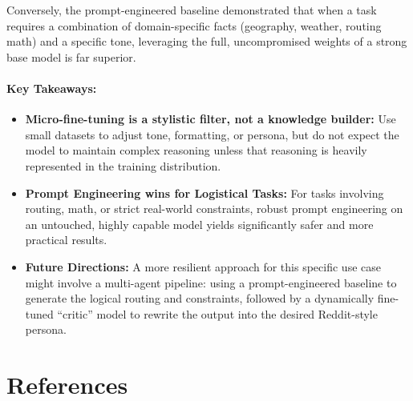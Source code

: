 \documentclass[12pt]{article}
\begin{document}
Conversely, the prompt-engineered baseline demonstrated that when a task requires a combination of domain-specific facts (geography, weather, routing math) and a specific tone, leveraging the full, uncompromised weights of a strong base model is far superior.

\paragraph{Key Takeaways:}
\begin{itemize}
    \item \textbf{Micro-fine-tuning is a stylistic filter, not a knowledge builder:} Use small datasets to adjust tone, formatting, or persona, but do not expect the model to maintain complex reasoning unless that reasoning is heavily represented in the training distribution.
    \item \textbf{Prompt Engineering wins for Logistical Tasks:} For tasks involving routing, math, or strict real-world constraints, robust prompt engineering on an untouched, highly capable model yields significantly safer and more practical results.
    \item \textbf{Future Directions:} A more resilient approach for this specific use case might involve a multi-agent pipeline: using a prompt-engineered baseline to generate the logical routing and constraints, followed by a dynamically fine-tuned ``critic'' model to rewrite the output into the desired Reddit-style persona.
\end{itemize}

\appendix
\section{References}


\end{document}
